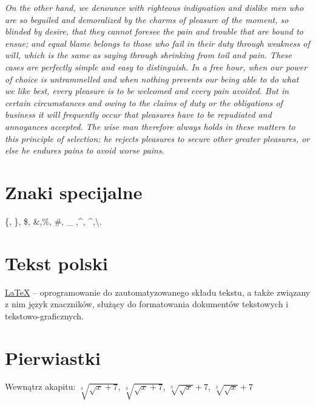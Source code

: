 \documentclass[a4paper, titlepage, 12pt]{amsart}
\begin{document}
\textsl{On the other hand, we denounce with righteous indignation and dislike men who are so beguiled and demoralized by the charms of pleasure of the moment, so blinded by desire, that they cannot foresee the pain and trouble that are bound to ensue; and equal blame belongs to those who fail in their duty through weakness of will, which is the same as saying through shrinking from toil and pain. These cases are perfectly simple and easy to distinguish. In a free hour, when our power of choice is untrammelled and when nothing prevents our being able to do what we like best, every pleasure is to be welcomed and every pain avoided. But in certain circumstances and owing to the claims of duty or the obligations of business it will frequently occur that pleasures have to be repudiated and annoyances accepted. The wise man therefore always holds in these matters to this principle of selection: he rejects pleasures to secure other greater pleasures, or else he endures pains to avoid worse pains}.

\section{Znaki specijalne}
\{, \}, \$, \&,\%, \#, \_ ,\textasciicircum, \^{},\textbackslash.

\section{Tekst polski}

\underline{LaTeX} – oprogramowanie do zautomatyzowanego sk\l{}adu tekstu, a tak\.ze zwi\k{a}zany z nim j\k{e}zyk znacznik\'ow, s\l{}u\.z\k{a}cy do formatowania dokument\'ow tekstowych i tekstowo-graficznych.


\section{Pierwiastki}
Wewnątrz akapitu: $\displaystyle \sqrt[3]{\sqrt {x}+7}$, $\sqrt[3]{\sqrt {x}+7}$, $\displaystyle \sqrt[3]{\sqrt {x}}+7$, $\sqrt[3]{\sqrt {x}}+7$
\end{document}
